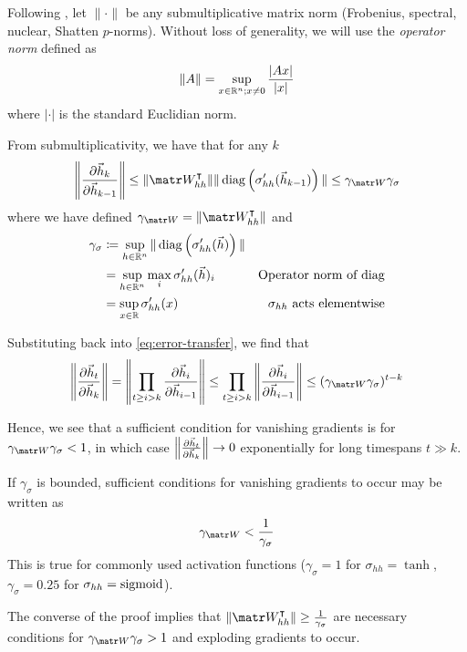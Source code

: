 Following \citet{Pascanu2012}, let $\| \cdot \|$ be any
submultiplicative matrix norm (\eg Frobenius, spectral, nuclear, Shatten
$p$-norms). Without loss of generality, we will use the \emph{operator norm}
defined as
\begin{equation}
    \| A \| = \sup_{x \in \mathbb{R}^n; x \neq 0} \frac{|A x|}{|x|}
\end{equation}
where $|\cdot|$ is the standard Euclidian norm.

From submultiplicativity, we have that for any $k$
\begin{equation}
    \left\| \frac{\pd \h_k}{\pd \h_{k-1}} \right\|
    \leq \| \W_{hh}^\tp \| \| \diag\left( \sigma_{hh}'(\h_{k-1}) \right) \|
    \leq \gamma_{\W} \gamma_\sigma
\end{equation}
where we have defined $\gamma_{\W} = \| \W_{hh}^\tp \|$ and
\begin{align}
    \gamma_\sigma
    &\coloneqq \sup_{h \in \mathbb{R}^n} \| \operatorname*{diag} \left( \sigma_{hh}'(\vec{h}) \right) \|  &\\
    &= \sup_{h \in \mathbb{R}^n} \max_i \sigma_{hh}'(\vec{h})_i &\mbox{Operator norm of diag} \\
    &= \sup_{x \in \mathbb{R}} \sigma_{hh}'(x) &\mbox{$\sigma_{hh}$ acts elementwise}
\end{align}

Substituting back into \cref{eq:error-transfer}, we find that
\begin{equation}
    \left\| \frac{\pd \h_t}{\pd \h_k} \right\|
    = \left\| \prod_{t \geq i > k} \frac{\pd \h_i}{\pd \h_{i-1}} \right\|
    \leq  \prod_{t \geq i > k} \left\| \frac{\pd \h_i}{\pd \h_{i-1}} \right\|
    \leq (\gamma_{\W} \gamma_\sigma)^{t-k}
\end{equation}

Hence, we see that a sufficient condition for vanishing gradients is
for $\gamma_{\W} \gamma_\sigma < 1$, in which case $\left\| \frac{\partial \vec{h}_t}{\partial \vec{h}_k} \right\| \to 0$
exponentially for long timespans $t \gg k$. %

If $\gamma_\sigma$ is bounded, sufficient
conditions for vanishing gradients to occur may be written as
\begin{equation}
    \gamma_{\W} < \frac{1}{\gamma_\sigma}
    \label{eq:vanishing-gradients-suff}
\end{equation}
This is true for commonly used activation functions (\eg $\gamma_\sigma = 1$
for $\sigma_{hh} = \tanh$, $\gamma_\sigma = 0.25$ for $\sigma_{hh} =
\operatorname*{sigmoid}$).

The converse of the proof implies that $\| \W_{hh}^\tp \| \geq
\frac{1}{\gamma_\sigma}$ are necessary conditions for $\gamma_{\W}
\gamma_\sigma > 1$ and exploding gradients to occur.

